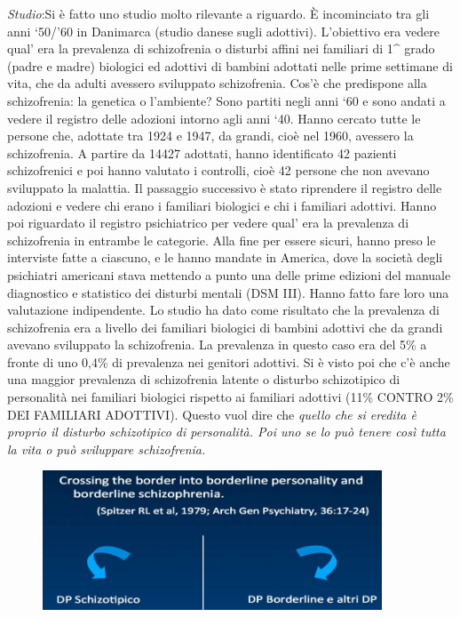\emph{Studio}:Si è fatto uno studio molto rilevante a riguardo. È
incominciato tra gli anni `50/'60 in Danimarca (studio danese sugli
adottivi). L'obiettivo era vedere qual' era la prevalenza di
schizofrenia o disturbi affini nei familiari di 1\^{} grado (padre e
madre) biologici ed adottivi di bambini adottati nelle prime settimane
di vita, che da adulti avessero sviluppato schizofrenia. Cos'è che
predispone alla schizofrenia: la genetica o l'ambiente? Sono partiti
negli anni `60 e sono andati a vedere il registro delle adozioni intorno
agli anni `40. Hanno cercato tutte le persone che, adottate tra 1924 e
1947, da grandi, cioè nel 1960, avessero la schizofrenia. A partire da
14427 adottati, hanno identificato 42 pazienti schizofrenici e poi hanno
valutato i controlli, cioè 42 persone che non avevano sviluppato la
malattia. Il passaggio successivo è stato riprendere il registro delle
adozioni e vedere chi erano i familiari biologici e chi i familiari
adottivi. Hanno poi riguardato il registro psichiatrico per vedere qual'
era la prevalenza di schizofrenia in entrambe le categorie. Alla fine
per essere sicuri, hanno preso le interviste fatte a ciascuno, e le
hanno mandate in America, dove la società degli psichiatri americani
stava mettendo a punto una delle prime edizioni del manuale diagnostico
e statistico dei disturbi mentali (DSM III). Hanno fatto fare loro una
valutazione indipendente. Lo studio ha dato come risultato che la
prevalenza di schizofrenia era a livello dei familiari biologici di
bambini adottivi che da grandi avevano sviluppato la schizofrenia. La
prevalenza in questo caso era del 5\% a fronte di uno 0,4\% di
prevalenza nei genitori adottivi. Si è visto poi che c'è anche una
maggior prevalenza di schizofrenia latente o disturbo schizotipico di
personalità nei familiari biologici rispetto ai familiari adottivi (11\%
CONTRO 2\% DEI FAMILIARI ADOTTIVI). Questo vuol dire che \emph{quello
che si eredita è proprio il disturbo schizotipico di personalità. Poi
uno se lo può tenere così tutta la vita o può sviluppare schizofrenia.}

\begin{figure}[!ht]
\centering
	\includegraphics[width=0.9\textwidth]{011/image7.jpeg}
\end{figure}

